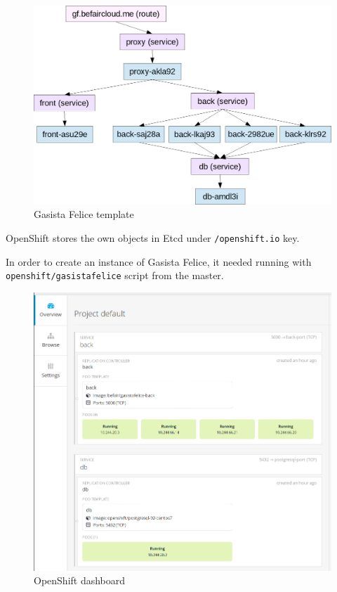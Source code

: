 \begin{figure}[htbp]
\centering
\includegraphics{media/ch5-template-gf.png}
\caption{Gasista Felice template}
\end{figure}

OpenShift stores the own objects in Etcd under \texttt{/openshift.io} key.

In order to create an instance of Gasista Felice, it needed running with \texttt{openshift/gasistafelice} script from the master.

\begin{figure}[htbp]
\centering
\includegraphics{media/ch5-openshift.png}
\caption{OpenShift dashboard}
\end{figure}

